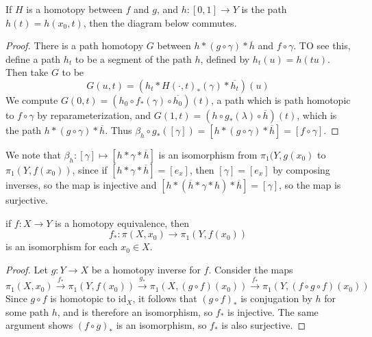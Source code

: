 \begin{lemma}
    If $H$ is a homotopy between $f$ and $g$, and $h: [0,1] \to Y$ is the path $h(t) = h(x_0,t)$, then the diagram below commutes.
    \begin{center}
    \end{center}
\end{lemma}
\begin{proof}
    There is a path homotopy $G$ between $h * (g \circ \gamma) * \overline{h}$ and $f \circ \gamma$. TO see this, define a path $h_t$ to be a segment of the path $h$, defined by $h_t(u) = h(tu)$. Then take $G$ to be
    \[ G(u,t) = (h_t * H(\cdot, t)_*(\gamma) * \overline{h_t})(u) \]
    We compute $G(0,t) = (h_0 \circ f_*(\gamma) \circ \overline{h_0})(t)$, a path which is path homotopic to $f \circ \gamma$ by reparameterization, and $G(1,t) = (h \circ g_*(\lambda) \circ \overline{h})(t)$, which is the path $h * (g \circ \gamma) * \overline{h}$. Thus $\beta_h \circ g_*([\gamma]) = [h * (g \circ \gamma) * \overline{h}] = [f \circ \gamma]$.
\end{proof}

We note that $\beta_h: [\gamma] \mapsto [h * \gamma * \overline{h}]$ is an isomorphism from $\pi_1(Y, g(x_0)$ to $\pi_1(Y, f(x_0))$, since if $[h * \gamma * \overline{h}] = [e_x]$, then $[\gamma] = [e_x]$ by composing inverses, so the map is injective and $[h * (\overline{h} * \gamma * h) * \overline{h}] = [\gamma]$, so the map is surjective.

\begin{theorem}
    if $f: X \to Y$ is a homotopy equivalence, then
    \[ f_*: \pi(X, x_0) \to \pi_1(Y, f(x_0)) \]
    is an isomorphism for each $x_0 \in X$.
\end{theorem}
\begin{proof}
    Let $g: Y \to X$ be a homotopy inverse for $f$. Consider the maps
    \[ \pi_1(X,x_0) \xrightarrow{f_*} \pi_1(Y, f(x_0)) \xrightarrow{g_*} \pi_1(X, (g \circ f)(x_0)) \xrightarrow{f_*} \pi_1(Y, (f \circ g \circ f)(x_0)) \]
    Since $g \circ f$ is homotopic to $\text{id}_X$, it follows that $(g \circ f)_*$ is conjugation by $h$ for some path $h$, and is therefore an isomorphism, so $f_*$ is injective. The same argument shows $(f \circ g)_*$ is an isomorphism, so $f_*$ is also surjective.
\end{proof}

